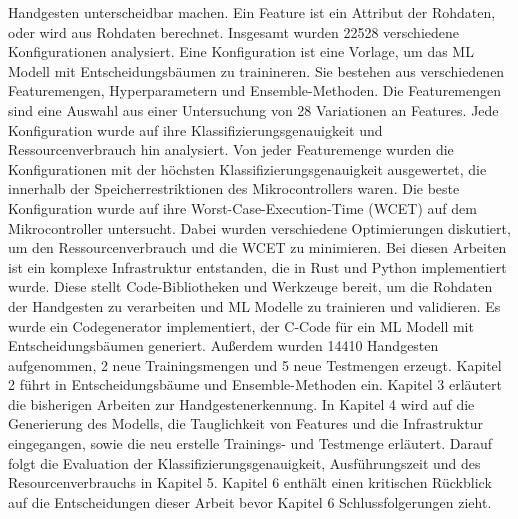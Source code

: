Handgesten unterscheidbar machen. Ein Feature ist ein Attribut der Rohdaten, oder wird aus Rohdaten berechnet.
\newline
\newline
Insgesamt wurden 22528 verschiedene Konfigurationen analysiert. Eine Konfiguration ist eine Vorlage, um das ML Modell mit Entscheidungsbäumen zu trainineren. Sie bestehen aus verschiedenen Featuremengen,
Hyperparametern und Ensemble-Methoden. Die Featuremengen sind eine Auswahl aus einer Untersuchung von 28 Variationen an Features. Jede Konfiguration wurde auf ihre Klassifizierungsgenauigkeit und Ressourcenverbrauch
hin analysiert. Von jeder Featuremenge wurden die Konfigurationen mit der höchsten Klassifizierungsgenauigkeit ausgewertet, die innerhalb der Speicherrestriktionen des Mikrocontrollers waren. Die beste
Konfiguration wurde auf ihre Worst-Case-Execution-Time (WCET) auf dem Mikrocontroller untersucht. Dabei wurden verschiedene Optimierungen diskutiert, um den Ressourcenverbrauch und die WCET zu minimieren.
Bei diesen Arbeiten ist ein komplexe Infrastruktur entstanden, die in Rust und Python implementiert wurde. Diese stellt Code-Bibliotheken und Werkzeuge bereit, um die Rohdaten der Handgesten zu verarbeiten und
ML Modelle zu trainieren und validieren. Es wurde ein Codegenerator implementiert, der C-Code für ein ML Modell mit Entscheidungsbäumen generiert. Außerdem wurden 14410 Handgesten aufgenommen,
2 neue Trainingsmengen und 5 neue Testmengen erzeugt.
\newline
\newline
Kapitel 2 führt in Entscheidungsbäume und Ensemble-Methoden ein. Kapitel 3 erläutert die bisherigen Arbeiten zur Handgestenerkennung. In Kapitel 4 wird auf die Generierung des Modells, die Tauglichkeit von
Features und die Infrastruktur eingegangen, sowie die neu erstelle Trainings- und Testmenge erläutert. Darauf folgt die Evaluation der Klassifizierungsgenauigkeit, Ausführungszeit und des Resourcenverbrauchs in
Kapitel 5. Kapitel 6 enthält einen kritischen Rückblick auf die Entscheidungen dieser Arbeit bevor Kapitel 6 Schlussfolgerungen zieht.